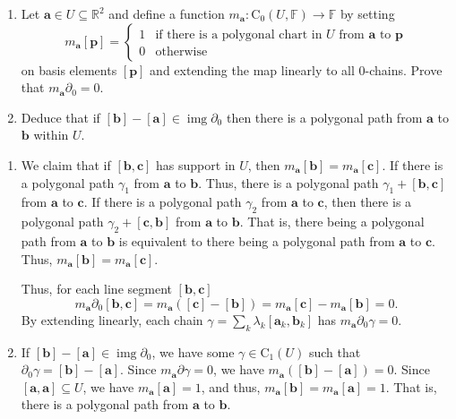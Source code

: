 \documentclass[12 pt, letterpaper]{hmcpset}
\begin{document}
\begin{problem}[22.]
	\begin{enumerate}
		\item Let $\mathbf{a} \in U \subseteq \mathbb{R}^{2}$ and define a function $m_{\mathbf{a}} : \mathrm{C}_{0}(U, \mathbb{F}) \to \mathbb{F}$ by setting
			\[
				m_{\mathbf{a}}[\mathbf{p}] = \begin{cases}
					1 & \text{if there is a polygonal chart in } U \text{ from } \mathbf{a} \text{ to }  \mathbf{p} \\
					0 & \text{otherwise}
				\end{cases}
			\]
			on basis elements $[\mathbf{p}]$ and extending the map linearly to all $0$-chains. Prove that $m_{\mathbf{a}} \partial_{0} = 0$.
		\item Deduce that if $[\mathbf{b}] - [\mathbf{a}] \in \operatorname{img} \partial_{0}$ then there is a polygonal path from $\mathbf{a}$ to $\mathbf{b}$ within $U$.
	\end{enumerate}
\end{problem}

\begin{solution}
	\begin{enumerate}
		\item We claim that if $[\mathbf{b}, \mathbf{c}]$ has support in $U$, then $m_{\mathbf{a}}[\mathbf{b}] = m_{\mathbf{a}}[\mathbf{c}]$. If there is a polygonal path $\gamma_{1}$ from $\mathbf{a}$ to $\mathbf{b}$. Thus, there is a polygonal path $\gamma_{1} + [\mathbf{b}, \mathbf{c}]$ from $\mathbf{a}$ to $\mathbf{c}$. If there is a polygonal path $\gamma_{2}$ from $\mathbf{a}$ to $\mathbf{c}$, then there is a polygonal path $\gamma_{2} + [\mathbf{c}, \mathbf{b}]$ from $\mathbf{a}$ to $\mathbf{b}$. That is, there being a polygonal path from $\mathbf{a}$ to $\mathbf{b}$ is equivalent to there being a polygonal path from $\mathbf{a}$ to $\mathbf{c}$. Thus, $m_{\mathbf{a}}[\mathbf{b}] = m_{\mathbf{a}}[\mathbf{c}]$.

			Thus, for each line segment $[\mathbf{b}, \mathbf{c}]$
			\[
				m_{\mathbf{a}} \partial_{0} [\mathbf{b}, \mathbf{c}] = m_{\mathbf{a}}([\mathbf{c}] - [\mathbf{b}]) = m_{\mathbf{a}}[\mathbf{c}] - m_{\mathbf{a}}[\mathbf{b}] = 0.
			\]
			By extending linearly, each chain $\gamma = \sum_{k} \lambda_{k} [\mathbf{a}_{k}, \mathbf{b}_{k}]$ has $m_{\mathbf{a}} \partial_{0} \gamma = 0$.

		\item If $[\mathbf{b}] - [\mathbf{a}] \in \operatorname{img} \partial_{0}$, we have some $\gamma \in \mathrm{C}_{1}(U)$ such that $\partial_{0} \gamma = [\mathbf{b}] - [\mathbf{a}]$. Since  $m_{\mathbf{a}} \partial \gamma = 0$, we have $m_{\mathbf{a}}([\mathbf{b}] - [\mathbf{a}]) = 0$. Since $[\mathbf{a}, \mathbf{a}] \subseteq U$, we have $m_{\mathbf{a}}[\mathbf{a}] = 1$, and thus, $m_{\mathbf{a}}[\mathbf{b}] = m_{\mathbf{a}}[\mathbf{a}] = 1$. That is, there is a polygonal path from $\mathbf{a}$ to $\mathbf{b}$.
	\end{enumerate}
\end{solution}
\end{document}
